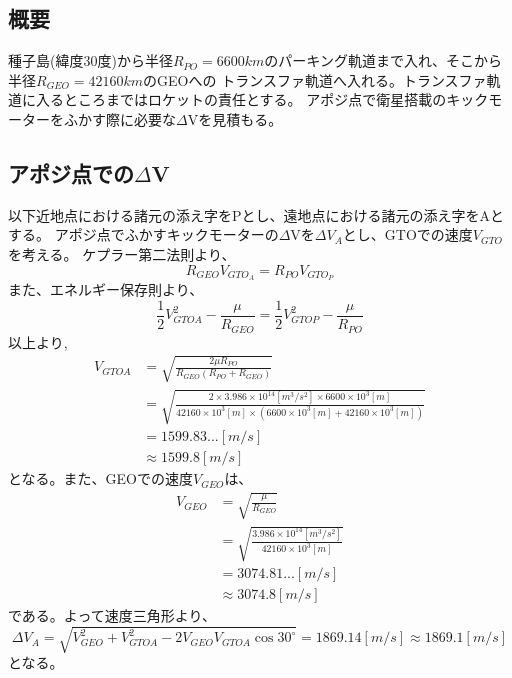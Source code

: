 \subsection{概要}
種子島(緯度30度)から半径$R_{PO}=6600km$のパーキング軌道まで入れ、そこから半径$R_{GEO}=42160km$のGEOへの
トランスファ軌道へ入れる。トランスファ軌道に入るところまではロケットの責任とする。
アポジ点で衛星搭載のキックモーターをふかす際に必要な$\Delta$Vを見積もる。
\subsection{アポジ点での$\Delta$V}
以下近地点における諸元の添え字をPとし、遠地点における諸元の添え字をAとする。
アポジ点でふかすキックモーターの$\Delta$Vを${\Delta}V_A$とし、GTOでの速度$V_{GTO}$を考える。
ケプラー第二法則より、
\begin{equation}
  R_{GEO}V_{GTO_A}=R_{PO}V_{GTO_P}
\end{equation}
また、エネルギー保存則より、
\begin{equation}
  \frac{1}{2} V_{GTOA}^2 - \frac{\mu}{R_{GEO}}
  =  \frac{1}{2} V_{GTOP}^2 - \frac{\mu}{R_{PO}}
\end{equation}
以上より,
\begin{align*}
  V_{GTOA} & = \sqrt{\frac{2\mu R_{PO}}{R_{GEO}(R_{PO}+R_{GEO})}} \\
           & = \sqrt{\frac{2\times3.986\times10^{14}[m^3/s^2]\times6600\times10^3[m]}
           {42160\times10^3[m]\times(6600\times10^3[m]+42160\times10^3[m])}} \\
           & = 1599.83...[m/s] \\
           & \approx 1599.8[m/s]
\end{align*}
となる。また、GEOでの速度$V_{GEO}$は、
\begin{align*}
  V_{GEO} &= \sqrt{\frac{\mu}{R_{GEO}}} \\
          &= \sqrt{\frac{3.986\times10^14[m^3/s^2]}{42160\times10^3[m]}} \\
          &= 3074.81...[m/s] \\
          & \approx 3074.8[m/s]
\end{align*}
である。よって速度三角形より、
\begin{equation}
  {\Delta}V_A = \sqrt{V_{GEO}^2+V_{GTOA}^2-2V_{GEO}V_{GTOA}\cos{30^ \circ }}
              = 1869.14[m/s]
               \approx{1869.1}[m/s]
\end{equation}
となる。
